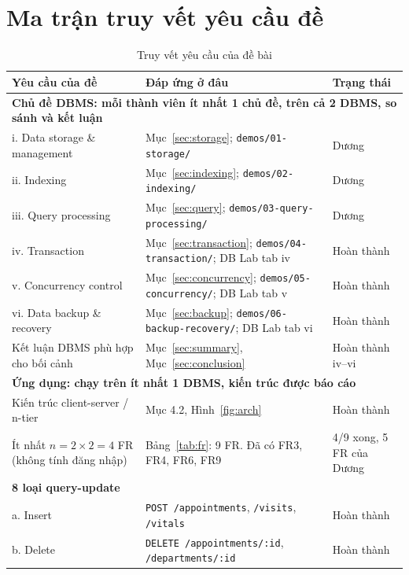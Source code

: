 \section{Ma trận truy vết yêu cầu đề}
\label{app:trace}

\begin{table}[H]
\centering
\caption{Truy vết yêu cầu của đề bài}
\label{tab:trace}
\small
\begin{tabularx}{\linewidth}{|p{4.4cm}|X|p{2.2cm}|}
\hline
\textbf{Yêu cầu của đề} & \textbf{Đáp ứng ở đâu} & \textbf{Trạng thái} \\ \hline
\multicolumn{3}{|l|}{\textbf{Chủ đề DBMS: mỗi thành viên ít nhất 1 chủ đề, trên cả 2 DBMS, so sánh và kết luận}} \\ \hline
i. Data storage \& management & Mục~\ref{sec:storage}; \texttt{demos/01-storage/} & Dương \\ \hline
ii. Indexing & Mục~\ref{sec:indexing}; \texttt{demos/02-indexing/} & Dương \\ \hline
iii. Query processing & Mục~\ref{sec:query}; \texttt{demos/03-query-processing/} & Dương \\ \hline
iv. Transaction & Mục~\ref{sec:transaction}; \texttt{demos/04-transaction/}; DB Lab tab iv & Hoàn thành \\ \hline
v. Concurrency control & Mục~\ref{sec:concurrency}; \texttt{demos/05-concurrency/}; DB Lab tab v & Hoàn thành \\ \hline
vi. Data backup \& recovery & Mục~\ref{sec:backup}; \texttt{demos/06-backup-recovery/}; DB Lab tab vi & Hoàn thành \\ \hline
Kết luận DBMS phù hợp cho bối cảnh & Mục~\ref{sec:summary}, Mục~\ref{sec:conclusion} & Hoàn thành iv--vi \\ \hline
\multicolumn{3}{|l|}{\textbf{Ứng dụng: chạy trên ít nhất 1 DBMS, kiến trúc được báo cáo}} \\ \hline
Kiến trúc client-server / n-tier & Mục 4.2, Hình~\ref{fig:arch} & Hoàn thành \\ \hline
Ít nhất $n = 2 \times 2 = 4$ FR (không tính đăng nhập) & Bảng~\ref{tab:fr}: 9 FR. Đã có FR3, FR4, FR6, FR9 & 4/9 xong, 5 FR của Dương \\ \hline
\multicolumn{3}{|l|}{\textbf{8 loại query-update}} \\ \hline
a. Insert & \texttt{POST /appointments}, \texttt{/visits}, \texttt{/vitals} & Hoàn thành \\ \hline
b. Delete & \texttt{DELETE /appointments/:id}, \texttt{/departments/:id} & Hoàn thành \\ \hline

\end{tabularx}
\end{table}

